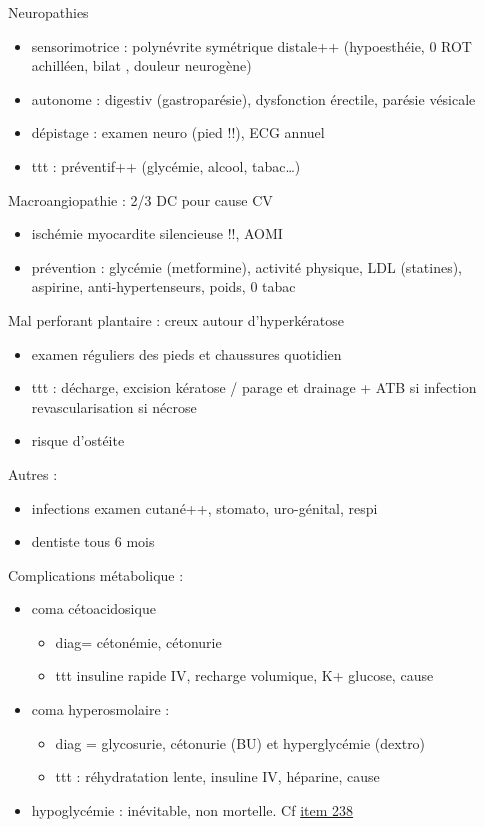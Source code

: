 \documentclass[11pt]{article}
\begin{document}
Neuropathies
\begin{itemize}
\item sensorimotrice : polynévrite symétrique distale++ (hypoesthéie, 0 ROT achilléen, bilat , douleur
neurogène)
\item autonome : digestiv (gastroparésie), dysfonction érectile, parésie vésicale
\item dépistage : examen neuro (pied !!), ECG annuel
\item ttt : préventif++ (glycémie, alcool, tabac\ldots{})
\end{itemize}
Macroangiopathie : 2/3 DC pour cause CV
\begin{itemize}
\item ischémie myocardite silencieuse !!, AOMI
\item prévention : glycémie (metformine), activité physique, LDL (statines),
aspirine, anti-hypertenseurs, poids, 0 tabac
\end{itemize}
Mal perforant plantaire : creux autour d'hyperkératose
\begin{itemize}
\item examen réguliers des pieds et chaussures quotidien
\item ttt : décharge, excision kératose / parage et drainage + ATB si infection \textpm{}
revascularisation si nécrose
\item risque d'ostéite
\end{itemize}
Autres : 
\begin{itemize}
\item infections \thus examen cutané++, stomato, uro-génital, respi
\item dentiste tous 6 mois
\end{itemize}
Complications métabolique :
\begin{itemize}
\item coma cétoacidosique 
\begin{itemize}
\item diag= cétonémie, cétonurie
\item ttt insuline rapide IV, recharge volumique, K+ \textpm{} glucose, cause
\end{itemize}
\item coma hyperosmolaire : 
\begin{itemize}
\item diag = glycosurie, cétonurie (BU) et hyperglycémie (dextro)
\item ttt : réhydratation lente, insuline IV, héparine, cause
\end{itemize}
\item hypoglycémie : inévitable, non mortelle. Cf \hyperref[sec:org9a95ee4]{item 238}
\end{itemize}
\end{document}
